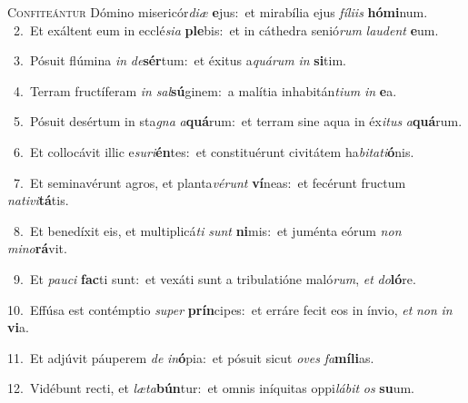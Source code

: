 \lettrine{\initial\textcolor{\initialcolor}{C}}{onfiteántur} Dómino misericór\-\textit{di}\-\textit{æ} \textbf{e}\-jus:~\star et mirabília ejus \textit{fí}\-\textit{li}\textit{is} \textbf{hó}\-\textbf{mi}num.\\
{\numbfont\textcolor{\numbcolor}{~2.}}~Et exáltent eum in ecclé\-\textit{si}\-\textit{a} \textbf{ple}\-bis:~\star et in cáthedra senió\textit{rum} \textit{lau}\-\textit{dent} \textbf{e}\-um.\par
{\numbfont\textcolor{\numbcolor}{~3.}}~Pósuit flúmina \textit{in} \textit{de}\-\textbf{sér}tum:~\star et éxitus a\-\textit{quá}\-\textit{rum} \textit{in} \textbf{si}\-tim.\par
{\numbfont\textcolor{\numbcolor}{~4.}}~Terram fructíferam \textit{in} \textit{sal}\-\textbf{sú}ginem:~\star a malítia inhabitán\-\textit{ti}\-\textit{um} \textit{in} \textbf{e}\-a.\par
{\numbfont\textcolor{\numbcolor}{~5.}}~Pósuit desértum in sta\textit{gna} \textit{a}\-\textbf{quá}rum:~\star et terram sine aqua in éx\-\textit{i}\-\textit{tus} \textit{a}\-\textbf{quá}rum.\par
{\numbfont\textcolor{\numbcolor}{~6.}}~Et collocávit illic e\-\textit{su}\-\textit{ri}\textbf{én}tes:~\star et constituérunt civitátem ha\-\textit{bi}\-\textit{ta}\textit{ti}\textbf{ó}nis.\par
{\numbfont\textcolor{\numbcolor}{~7.}}~Et seminavérunt agros, et planta\-\textit{vé}\-\textit{runt} \textbf{ví}\-neas:~\star et fecérunt fructum \textit{na}\-\textit{ti}\textit{vi}\textbf{tá}tis.\par
{\numbfont\textcolor{\numbcolor}{~8.}}~Et benedíxit eis, et multiplicá\textit{ti} \textit{sunt} \textbf{ni}\-mis:~\star et juménta eórum \textit{non} \textit{mi}\-\textit{no}\textbf{rá}vit.\par
{\numbfont\textcolor{\numbcolor}{~9.}}~Et \textit{pau}\-\textit{ci} \textbf{fac}\-ti sunt:~\star et vexáti sunt a tribulatióne maló\-\textit{rum}\-, \textit{et} \textit{do}\-\textbf{ló}re.\par
{\numbfont\textcolor{\numbcolor}{10.}}~Effúsa est contémptio \textit{su}\-\textit{per} \textbf{prín}\-cipes:~\star et erráre fecit eos in ínvio, \textit{et} \textit{non} \textit{in} \textbf{vi}\-a.\par
{\numbfont\textcolor{\numbcolor}{11.}}~Et adjúvit páuperem \textit{de} \textit{in}\-\textbf{ó}pia:~\star et pósuit sicut \textit{o}\-\textit{ves} \textit{fa}\-\textbf{mí}\textbf{li}as.\par
{\numbfont\textcolor{\numbcolor}{12.}}~Vidébunt recti, et \textit{læ}\-\textit{ta}\textbf{bún}tur:~\star et omnis iníquitas oppi\-\textit{lá}\-\textit{bit} \textit{os} \textbf{su}\-um.\par
